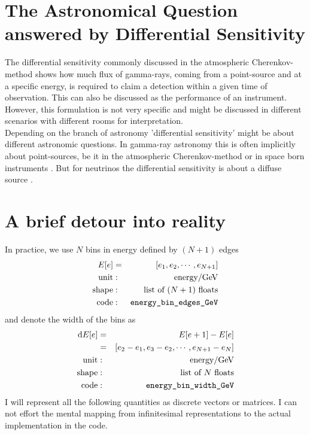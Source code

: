 \documentclass{article}%
\begin{document}
\section{The Astronomical Question answered by Differential Sensitivity}
\label{SecAstronomicalQuastion}
The differential sensitivity commonly discussed in the atmospheric Cherenkov-method shows how much flux of gamma-rays, coming from a point-source and at a specific energy, is required to claim a detection within a given time of observation.
%
This can also be discussed as the performance of an instrument.
%
\\
%
However, this formulation is not very specific and might be discussed in different scenarios with different rooms for interpretation.
%
\\
%
Depending on the branch of astronomy 'differential sensitivity' might be about different astronomic questions.
%
In gamma-ray astronomy this is often implicitly about point-sources, be it in the atmospheric Cherenkov-method \cite{cta2018baseline,cortina2016machete} or in space born instruments \cite{wood2016fermiperformance}.
%
But for neutrinos the differential sensitivity is about a diffuse source \cite{marinelli2021km3netarca}.
%
\section{A brief detour into reality}
%
In practice, we use $N$ bins in energy defined by $(N+1)$ edges
%
\begin{eqnarray*}
E[e] &=& [e_1, e_2, \cdots, e_{N+1}]\\
\text{unit} &:& \text{energy} / \text{GeV}\\
\text{shape} &:& \text{list of}\,\,(N + 1)\,\,\text{floats}\\
\text{code} &:& \verb|energy_bin_edges_GeV|
\end{eqnarray*}
%
and denote the width of the bins as
%
\begin{eqnarray*}
\text{d}E[e] &=& E[e+1] - E[e]\\
&=& [e_2-e_1, e_3-e_2, \cdots, e_{N+1}-e_N]\\
\text{unit} &:& \text{energy} / \text{GeV}\\
\text{shape} &:& \text{list of}\,\,N\,\,\text{floats}\\
\text{code} &:& \verb|energy_bin_width_GeV|
\end{eqnarray*}
%
I will represent all the following quantities as discrete vectors or matrices.
%
I can not effort the mental mapping from infinitesimal representations to the actual implementation in the code.
%
\end{document}
